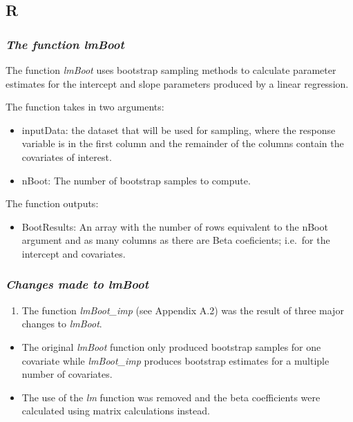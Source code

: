 \documentclass[]{article}
\providecommand{\tightlist}{%
  \setlength{\itemsep}{0pt}\setlength{\parskip}{0pt}}
\begin{document}
\pagebreak

\subsection{R}\label{r}

\subsubsection{\texorpdfstring{\emph{The function
lmBoot}}{The function lmBoot}}\label{the-function-lmboot}

The function \emph{lmBoot} uses bootstrap sampling methods to calculate
parameter estimates for the intercept and slope parameters produced by a
linear regression.

The function takes in two arguments:

\begin{itemize}
\tightlist
\item
  inputData: the dataset that will be used for sampling, where the
  response variable is in the first column and the remainder of the
  columns contain the covariates of interest.
\item
  nBoot: The number of bootstrap samples to compute.
\end{itemize}

The function outputs:

\begin{itemize}
\tightlist
\item
  BootResults: An array with the number of rows equivalent to the nBoot
  argument and as many columns as there are Beta coeficients; i.e.~for
  the intercept and covariates.
\end{itemize}

\subsubsection{\texorpdfstring{\emph{Changes made to
lmBoot}}{Changes made to lmBoot}}\label{changes-made-to-lmboot}

\begin{enumerate}
\def\labelenumi{\arabic{enumi}.}
\tightlist
\item
  The function \emph{lmBoot\_imp} (see Appendix A.2) was the result of
  three major changes to \emph{lmBoot}.
\end{enumerate}

\begin{itemize}
\tightlist
\item
  The original \emph{lmBoot} function only produced bootstrap samples
  for one covariate while \emph{lmBoot\_imp} produces bootstrap
  estimates for a multiple number of covariates.
\item
  The use of the \emph{lm} function was removed and the beta
  coefficients were calculated using matrix calculations instead.
\end{itemize}
\end{document}
